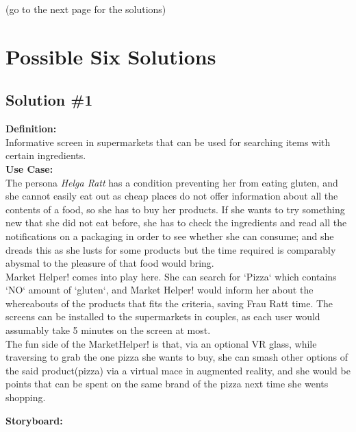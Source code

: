 \documentclass[a4paper,10pt,oneside]{scrreprt}
\begin{document}
				\vspace{2cm}
				\begin{center}
					\centering
					(go to the next page for the solutions)
				\end{center}


	\clearpage

	\section{Possible Six Solutions}

		\subsection{Solution \#1}

			\textbf{Definition:}\\
			\indent Informative screen in supermarkets that can be used for searching items with certain ingredients.\\

			\noindent \textbf{Use Case:}\\
			\indent The persona \textit{Helga Ratt} has a condition preventing her from eating gluten, and she cannot easily eat out as cheap places do not offer information about all the contents of a food, so she has to buy her products. If she wants to try something new that she did not eat before, she has to check the ingredients and read all the notifications on a packaging in order to see whether she can consume; and she dreads this as she lusts for some products but the time required is comparably abysmal to the pleasure of that food would bring.\\

			Market Helper! comes into play here. She can search for `Pizza` which contains `NO` amount of `gluten`, and Market Helper! would inform her about the whereabouts of the products that fits the criteria, saving Frau Ratt time. The screens can be installed to the supermarkets in couples, as each user would assumably take 5 minutes on the screen at most.\\

			The fun side of the MarketHelper! is that, via an optional VR glass, while traversing to grab the one pizza she wants to buy, she can smash other options of the said product(pizza) via a virtual mace in augmented reality, and she would be points that can be spent on the same brand of the pizza next time she wents shopping.

			\noindent \textbf{Storyboard:}\\
\end{document}

